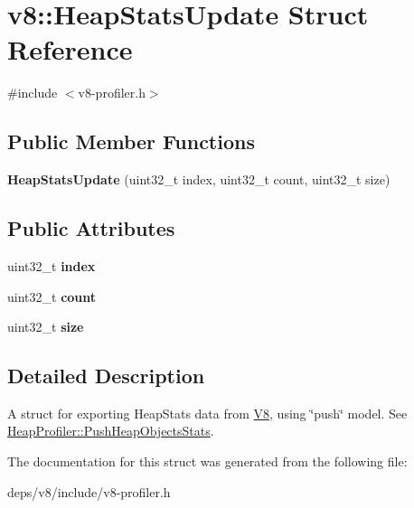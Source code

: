 \hypertarget{structv8_1_1_heap_stats_update}{}\section{v8\+:\+:Heap\+Stats\+Update Struct Reference}
\label{structv8_1_1_heap_stats_update}


{\ttfamily \#include $<$v8-\/profiler.\+h$>$}

\subsection*{Public Member Functions}
\begin{DoxyCompactItemize}
\item 
\hypertarget{structv8_1_1_heap_stats_update_aba606181fa7071647cc91a558c450cf3}{}{\bfseries Heap\+Stats\+Update} (uint32\+\_\+t index, uint32\+\_\+t count, uint32\+\_\+t size)\label{structv8_1_1_heap_stats_update_aba606181fa7071647cc91a558c450cf3}

\end{DoxyCompactItemize}
\subsection*{Public Attributes}
\begin{DoxyCompactItemize}
\item 
\hypertarget{structv8_1_1_heap_stats_update_a90f427acc6e9b8cf2001ca09541545d7}{}uint32\+\_\+t {\bfseries index}\label{structv8_1_1_heap_stats_update_a90f427acc6e9b8cf2001ca09541545d7}

\item 
\hypertarget{structv8_1_1_heap_stats_update_aa74badb1bd196e538b45b971350c33de}{}uint32\+\_\+t {\bfseries count}\label{structv8_1_1_heap_stats_update_aa74badb1bd196e538b45b971350c33de}

\item 
\hypertarget{structv8_1_1_heap_stats_update_a842a199bd372f411f0ae5816e38c45e2}{}uint32\+\_\+t {\bfseries size}\label{structv8_1_1_heap_stats_update_a842a199bd372f411f0ae5816e38c45e2}

\end{DoxyCompactItemize}


\subsection{Detailed Description}
A struct for exporting Heap\+Stats data from \hyperlink{classv8_1_1_v8}{V8}, using \char`\"{}push\char`\"{} model. See \hyperlink{classv8_1_1_heap_profiler_a77bf2e6bfc3b2fd23451ecded49515ac}{Heap\+Profiler\+::\+Push\+Heap\+Objects\+Stats}. 

The documentation for this struct was generated from the following file\+:\begin{DoxyCompactItemize}
\item 
deps/v8/include/v8-\/profiler.\+h\end{DoxyCompactItemize}
